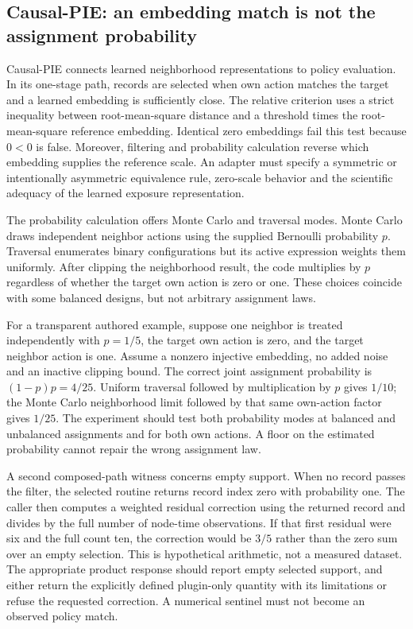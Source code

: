 \subsection{Causal-PIE: an embedding match is not the assignment probability}

Causal-PIE connects learned neighborhood representations to policy evaluation. In its one-stage path, records are selected when own action matches the target and a learned embedding is sufficiently close. The relative criterion uses a strict inequality between root-mean-square distance and a threshold times the root-mean-square reference embedding. Identical zero embeddings fail this test because $0<0$ is false. Moreover, filtering and probability calculation reverse which embedding supplies the reference scale. An adapter must specify a symmetric or intentionally asymmetric equivalence rule, zero-scale behavior and the scientific adequacy of the learned exposure representation.\citep{exec25_pnet_pie}

The probability calculation offers Monte Carlo and traversal modes. Monte Carlo draws independent neighbor actions using the supplied Bernoulli probability $p$. Traversal enumerates binary configurations but its active expression weights them uniformly. After clipping the neighborhood result, the code multiplies by $p$ regardless of whether the target own action is zero or one. These choices coincide with some balanced designs, but not arbitrary assignment laws.\citep{exec25_pnet_pie}

For a transparent authored example, suppose one neighbor is treated independently with $p=1/5$, the target own action is zero, and the target neighbor action is one. Assume a nonzero injective embedding, no added noise and an inactive clipping bound. The correct joint assignment probability is $(1-p)p=4/25$. Uniform traversal followed by multiplication by $p$ gives $1/10$; the Monte Carlo neighborhood limit followed by that same own-action factor gives $1/25$. The experiment should test both probability modes at balanced and unbalanced assignments and for both own actions. A floor on the estimated probability cannot repair the wrong assignment law.\citep{exec25_pnet_choice}

A second composed-path witness concerns empty support. When no record passes the filter, the selected routine returns record index zero with probability one. The caller then computes a weighted residual correction using the returned record and divides by the full number of node-time observations. If that first residual were six and the full count ten, the correction would be $3/5$ rather than the zero sum over an empty selection. This is hypothetical arithmetic, not a measured dataset. The appropriate product response should report empty selected support, and either return the explicitly defined plugin-only quantity with its limitations or refuse the requested correction. A numerical sentinel must not become an observed policy match.\citep{exec25_pnet_pie,exec25_pnet_choice}

